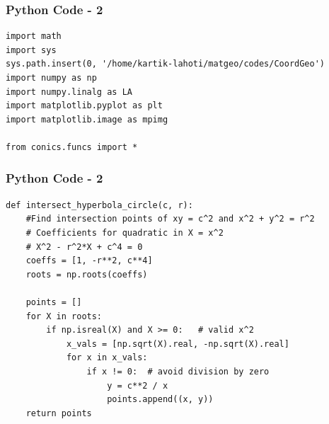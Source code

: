 \documentclass{beamer}
\begin{document}
\begin{frame}[fragile]
    \frametitle{Python Code - 2}
    \begin{lstlisting}
import math
import sys
sys.path.insert(0, '/home/kartik-lahoti/matgeo/codes/CoordGeo')
import numpy as np
import numpy.linalg as LA
import matplotlib.pyplot as plt
import matplotlib.image as mpimg

from conics.funcs import *
\end{lstlisting}
\end{frame}

\begin{frame}[fragile]
    \frametitle{Python Code - 2}
    \begin{lstlisting}
def intersect_hyperbola_circle(c, r):
    #Find intersection points of xy = c^2 and x^2 + y^2 = r^2
    # Coefficients for quadratic in X = x^2
    # X^2 - r^2*X + c^4 = 0
    coeffs = [1, -r**2, c**4]
    roots = np.roots(coeffs)

    points = []
    for X in roots:
        if np.isreal(X) and X >= 0:   # valid x^2
            x_vals = [np.sqrt(X).real, -np.sqrt(X).real]
            for x in x_vals:
                if x != 0:  # avoid division by zero
                    y = c**2 / x
                    points.append((x, y))
    return points

\end{lstlisting}
\end{frame}
\end{document}
